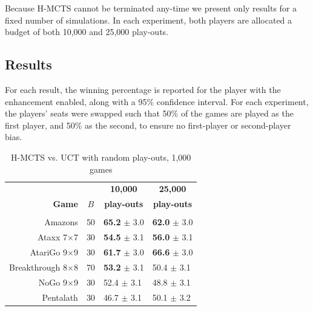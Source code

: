 \documentclass[a4paper]{llncs}
\begin{document}
Because H-MCTS cannot be terminated any-time we present only results for a fixed number of simulations. In each experiment, both players are allocated a budget of both 10,000 and 25,000 play-outs.

\subsection{Results}
\label{subsec:results}
For each result, the winning percentage is reported for the player with the enhancement enabled, along with a 95\% confidence interval. For each experiment, the players' seats were swapped such that 50\% of the games are played as the first player, and 50\% as the second, to ensure no first-player or second-player bias.

\begin{table}[ht]
\centering
\tabcolsep=0.3cm
\begin{tabular}{rlll}
\hline
\multicolumn{2}{c|}{} & \multicolumn{1}{c}{\textbf{10,000}} & \multicolumn{1}{c}{\textbf{25,000}} \\ 
\textbf{Game} & \multicolumn{1}{c|}{\textbf{$B$}} & \multicolumn{1}{c}{\textbf{play-outs}} & \multicolumn{1}{c}{\textbf{play-outs}} \\ [1mm] 
\cline{1-4}
\multicolumn{2}{c|}{} \\ [-3mm]
Amazons &\multicolumn{1}{l|}{50}			    	& {\bf{65.2}} $\pm$ 3.0 		& {\bf{62.0}} $\pm$ 3.0 		\\ [.5mm] 
Ataxx 7$\times$7 &\multicolumn{1}{l|}{30} 			& {\bf{54.5}} $\pm$ 3.1			& {\bf{56.0}} $\pm$ 3.1 		\\ [.5mm] 
AtariGo 9$\times$9 &\multicolumn{1}{l|}{30} 		& {\bf{61.7}} $\pm$ 3.0 		& {\bf{66.6}} $\pm$ 3.0 		\\ [.5mm] 
Breakthrough 8$\times$8 &\multicolumn{1}{l|}{70}	& {\bf{53.2}} $\pm$ 3.1	& 50.4 $\pm$ 3.1 	\\ [.5mm] 
NoGo 9$\times$9 &\multicolumn{1}{l|}{30} 			& 52.4 $\pm$ 3.1	& 48.8 $\pm$ 3.1 	\\ [.5mm] 
Pentalath &\multicolumn{1}{l|}{30} 		  			& 46.7 $\pm$ 3.1	& 50.1 $\pm$ 3.2 	\\ [.5mm] 
\hline
\end{tabular}
\vspace{4mm}
{\caption{H-MCTS vs. UCT with random play-outs, 1,000 games} \label{tab:uct_hmcts}}
\end{table}
\end{document}
